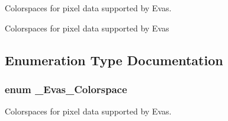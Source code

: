 Colorspaces for pixel data supported by Evas. 

Colorspaces for pixel data supported by Evas 

\subsection{Enumeration Type Documentation}
\subsubsection[{\_\-Evas\_\-Colorspace}]{\setlength{\rightskip}{0pt plus 5cm}enum {\bf \_\-Evas\_\-Colorspace}}\label{group__Evas__Object__Image_ga84ff1db3d33d85c86d81dbe9046b54bb}


Colorspaces for pixel data supported by Evas. 

